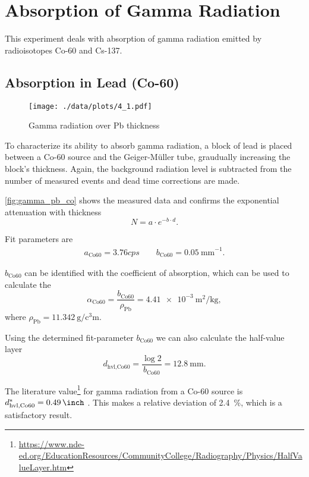 \chapter{Absorption of Gamma Radiation}
This experiment deals with absorption of gamma radiation emitted by radioisotopes Co-60 and Cs-137.

\section{Absorption in Lead (Co-60)}\label{sec:co}
\begin{figure}[ht!]
	\centering
	\texttt{[image: ./data/plots/4\_1.pdf]}
	\caption[Gamma radiation over Pb thickness (Co-60)]{Gamma radiation over Pb thickness}
	\label{fig:gamma_pb_co}
\end{figure}
To characterize its ability to absorb gamma radiation, a block of lead is placed between a Co-60 source and the Geiger-Müller tube, graudually increasing the block's thickness.
Again, the background radiation level is subtracted from the number of measured events and dead time corrections are made.

\autoref{fig:gamma_pb_co} shows the measured data and confirms the exponential attenuation with thickness
\begin{equation*}
	N = a \cdot e^{-b \cdot d}.
\end{equation*}

Fit parameters are
\begin{gather*}
	a_\text{Co60}=\num{3.76}cps\qquad b_\text{Co60}=\SI{0.05}{\milli\meter}^{-1}.
\end{gather*}

$b_\text{Co60}$ can be identified with the coefficient of absorption, which can be used to calculate the 
\begin{equation*}
	\alpha_\text{Co60}=\frac{b_\text{Co60}}{\rho_\text{Pb}}=\SI{4.41e-3}{\meter\squared\per\kilogram},
\end{equation*}
where $\rho_\text{Pb}=\SI{11.342}{\gram\per\cubic\centi\meter}$.

Using the determined fit-parameter $b_\text{Co60}$ we can also calculate the half-value layer
\begin{equation*}
	d_\text{hvl,Co60}=\frac{\log{2}}{b_\text{Co60}}=\SI{12.8}{\milli\meter}.
\end{equation*}

The literature value\footnote{\url{https://www.nde-ed.org/EducationResources/CommunityCollege/Radiography/Physics/HalfValueLayer.htm}} for gamma radiation from a Co-60 source is $d_\text{hvl,Co60}^{*}=\SI{0.49}{\inch}$ .
This makes a relative deviation of \SI{2.4}{\percent}, which is a satisfactory result.

